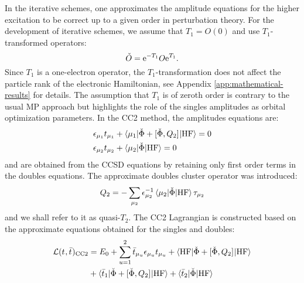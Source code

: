 In the iterative schemes, one approximates the amplitude equations for
the higher excitation to be correct up to a given order in perturbation
theory.
For the development of iterative schemes, we assume that $T_1 = O(0)$
and use $T_1$-transformed operators:
\begin{equation}
  \label{eq:t1-transformation}
  \check{O} = \mathrm{e}^{-T_1}O\mathrm{e}^{T_1}.
\end{equation}
Since $T_1$ is a one-electron operator, the $T_1$-transformation does
not affect the particle rank of the electronic
Hamiltonian,\autocite{Koch1994-vr, Helgaker2000-tz}
see Appendix \ref{app:mathematical-results} for details.
The assumption that $T_1$ is of zeroth order is contrary to the usual
\acrshort*{MP} approach but highlights the role of the singles
amplitudes as orbital optimization parameters.
In the \gls{CC2} method, the amplitudes equations are:\autocite{Christiansen1995-vy, Helgaker2000-tz}
\begin{subequations}\label{eq:cc2-amplitudes}
  \begin{align}
    \epsilon_{\mu_1}t_{\mu_1} &+ \braket{\mu_1 | \check{\Phi} +
    [ \check{\Phi}, Q_2 ]^{} | \mathrm{HF}} = 0
    \label{eq:cc2-singles-amplitudes} \\
    \epsilon_{\mu_2}t_{\mu_2} &+ \braket{\mu_2 | \check{\Phi} | \mathrm{HF}} = 0
    \label{eq:cc2-doubles-amplitudes}
  \end{align}
\end{subequations}
and are obtained from the \acrshort{CCSD} equations by retaining only
first order terms in the doubles equations.
The approximate doubles cluster operator was introduced:
\begin{equation}
  Q_2 = - \sum_{\mu_2}
  \epsilon_{\mu_2}^{-1}\braket{\mu_2 | \check{\Phi} | \mathrm{HF}}\tau_{\mu_2}
\end{equation}
and we shall refer to it as quasi-$T_2$.
The \acrshort*{CC2} Lagrangian is constructed based on the approximate
equations obtained for the singles and
doubles:\autocite{Christiansen1995-vy, Helgaker2000-tz}
\begin{equation}\label{eq:cc2-lagrangian}
  \begin{aligned}
  \mathcal{L}(t_{}, \bar{t}_{})_\mathrm{CC2}
  &=
  E_0
  + \sum_{u=1}^{2}\bar{t}_{\mu_u}\epsilon_{\mu_u}t_{\mu_u}
  + \braket{\mathrm{HF} | \check{\Phi} + [ \check{\Phi}, Q_2 ]^{} | \mathrm{HF}} \\
  &+ \braket{\bar{t}_{1} |
  \check{\Phi} + [ \check{\Phi}, Q_2 ]^{}
  | \mathrm{HF}}
  + \braket{\bar{t}_{2} | \check{\Phi} | \mathrm{HF}}
  \end{aligned}
\end{equation}
